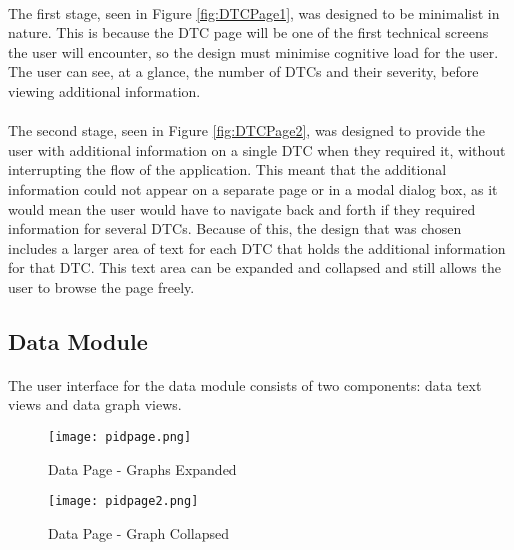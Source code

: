 		\paragraph{}{
		The first stage, seen in Figure \ref{fig:DTCPage1}, was designed to be minimalist in nature. This is because the DTC page will be one of the first technical screens the user will encounter, so the design must minimise cognitive load for the user. The user can see, at a glance, the number of DTCs and their severity, before viewing additional information. 		
		}
		\paragraph{}{
		The second stage, seen in Figure \ref{fig:DTCPage2}, was designed to provide the user with additional information on a single DTC when they required it, without interrupting the flow of the application. This meant that the additional information could not appear on a separate page or in a modal dialog box, as it would mean the user would have to navigate back and forth if they required information for several DTCs. Because of this, the design that was chosen includes a larger area of text for each DTC that holds the additional information for that DTC. This text area can be expanded and collapsed and still allows the user to browse the page freely.
		}
					
	\subsection{Data Module}
		\paragraph{}{	
		The user interface for the data module consists of two components: data text views and data graph views.  
		}
		
		\begin{figure}[h]
			\begin{center}								
				\begin{minipage}{0.49\textwidth}
					\texttt{[image: pidpage.png]}
					\caption{Data Page - Graphs Expanded}						
					\label{fig:DataPage1}
				\end{minipage}
				\hfill			
				\begin{minipage}{0.49\textwidth}
					\texttt{[image: pidpage2.png]}
					\caption{Data Page - Graph Collapsed}						
					\label{fig:DataPage2}
				\end{minipage}									
			\end{center}
		\end{figure}
		

